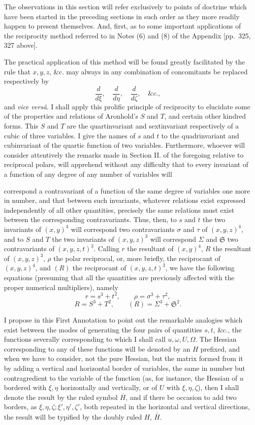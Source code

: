 \documentclass[11pt]{article}
\newcommand{\sourcepage}[1]{\marginpar{\scriptsize p.~#1}}
\begin{document}
{{The observations in this section will refer exclusively to points of doctrine which have been started in the preceding sections in such order as they more readily happen to present themselves. And, first, as to some important applications of the reciprocity method referred to in Notes (6) and (8) of the Appendix [pp.~325, 327 above].

The practical application of this method will be found greatly facilitated by the rule that $x,y,z$, \&c. may always in any combination of concomitants be replaced respectively by
\[
\frac{d}{d\xi},\quad \frac{d}{d\eta},\quad \frac{d}{d\zeta},\quad \&c.,
\]
and \emph{vice versâ}. I shall apply this prolific principle of reciprocity to elucidate some of the properties and relations of Aronhold's $S$ and $T$, and certain other kindred forms. This $S$ and $T$ are the quartinvariant and sextinvariant respectively of a cubic of three variables. I give the names of $s$ and $t$ to the quadrinvariant and cubinvariant of the quartic function of two variables. Furthermore, whoever will consider attentively the remarks made in Section II. of the foregoing relative to reciprocal polars, will apprehend without any difficulty that to every invariant of a function of any degree of any number of variables will

\sourcepage{329}
correspond a contravariant of a function of the same degree of variables one more in number, and that between such invariants, whatever relations exist expressed independently of all other quantities, precisely the same relations must exist between the corresponding contravariants. Thus, then, to $s$ and $t$ the two invariants of $(x,y)^4$ will correspond two contravariants $\sigma$ and $\tau$ of $(x,y,z)^4$, and to $S$ and $T$ the two invariants of $(x,y,z)^3$ will correspond $\Sigma$ and $\mathfrak{S}$ two contravariants of $(x,y,z,t)^3$. Calling $r$ the resultant of $(x,y)^4$, $R$ the resultant of $(x,y,z)^3$, $\rho$ the polar reciprocal, or, more briefly, the reciprocant of $(x,y,z)^4$, and $(R)$ the reciprocant of $(x,y,z,t)^3$, we have the following equations (presuming that all the quantities are previously affected with the proper numerical multipliers), namely
\[
r=s^3+t^2,\qquad \rho=\sigma^3+\tau^2,
\]
\[
R=S^3+T^2,\qquad (R)=\Sigma^3+\mathfrak{S}^2.
\]

I propose in this First Annotation to point out the remarkable analogies which exist between the modes of generating the four pairs of quantities $s,t$, \&c., the functions severally corresponding to which I shall call $u,\omega,U,\Omega$. The Hessian corresponding to any of these functions will be denoted by an $H$ prefixed, and when we have to consider, not the pure Hessian, but the matrix formed from it by adding a vertical and horizontal border of variables, the same in number but contragredient to the variable of the function (as, for instance, the Hessian of $u$ bordered with $\xi,\eta$ horizontally and vertically, or of $U$ with $\xi,\eta,\zeta$), then I shall denote the result by the ruled symbol $\overline H$, and if there be occasion to add two borders, as $\xi,\eta,\zeta;\xi',\eta',\zeta'$, both repeated in the horizontal and vertical directions, the result will be typified by the doubly ruled $H$, $\overline{\overline H}$.

}}
\end{document}
